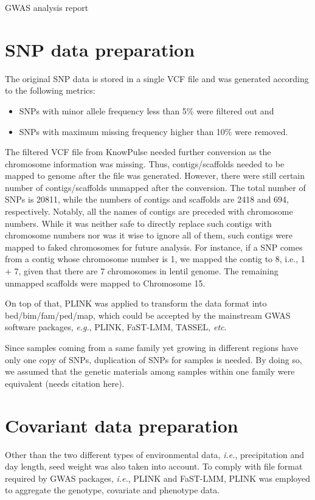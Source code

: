\documentclass{article}
\begin{document}
GWAS analysis report

\section*{SNP data preparation}
The original SNP data is stored in a single VCF file and was generated according to the following metrics:
\begin{itemize}
	\item SNPs with minor allele frequency less than 5\% were filtered out and
	\item SNPs with maximum missing frequency higher than 10\% were removed.
\end{itemize}
The filtered VCF file from KnowPulse needed further conversion as the chromosome information was missing. Thus, contigs/scaffolds needed to be mapped to genome after the file was generated. However, there were still certain number of contigs/scaffolds unmapped after the conversion. The total number of SNPs is 20811, while the numbers of contigs and scaffolds are 2418 and 694, respectively. Notably, all the names of contigs are preceded with chromosome numbers. While it was neither safe to directly replace such contigs with chromosome numbers nor was it wise to ignore all of them, such contigs were mapped to faked chromosomes for future analysis. For instance, if a SNP comes from a contig whose chromosome number is 1, we mapped the contig to 8, i.e., 1 + 7, given that there are 7 chromosomes in lentil genome. The remaining unmapped scaffolds were mapped to Chromosome 15.

On top of that, PLINK was applied to transform the data format into bed/bim/fam/ped/map, which could be accepted by the mainstream GWAS software packages, \emph{e.g.}, PLINK, FaST-LMM, TASSEL, \emph{etc}. 

Since samples coming from a same family yet growing in different regions have only one copy of SNPs, duplication of SNPs for samples is needed. By doing so, we assumed that the genetic materials among samples within one family were equivalent (needs citation here). 

\section*{Covariant data preparation}
Other than the two different types of environmental data, \emph{i.e.}, precipitation and day length, seed weight was also taken into account. To comply with file format required by GWAS packages, \emph{i.e.}, PLINK and FaST-LMM, PLINK was employed to aggregate the genotype, covariate and phenotype data. 
\end{document}

